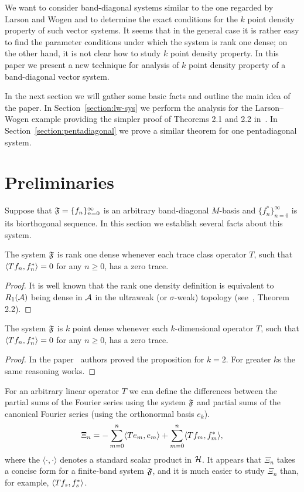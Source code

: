 \documentclass[12pt]{amsart}
\theoremstyle{case}
\begin{document}
    We want to consider band-diagonal systems similar to the one regarded by Larson and Wogen and to determine the exact conditions
      for the $k$ point density property of such vector systems.
    It seems that in the general case it is rather easy to find the parameter conditions under which the system is rank one dense;
      on the other hand, it is not clear how to study $k$ point density property.
    In this paper we present a new technique for analysis of $k$ point density property of a band-diagonal vector system.

    In the next section we will gather some basic facts and outline the main idea of the paper.
    In Section~\ref{section:lw-sys} we perform the analysis for the Larson--Wogen example providing the simpler proof of Theorems 2.1 and 2.2 in~\cite{katavolos}.
    In Section~\ref{section:pentadiagonal} we prove a similar theorem for one pentadiagonal system.
\section{Preliminaries}
  \label{sec:preliminaries}
  Suppose that $\fsys=\{f_n\}_{n=0}^\infty$ is an arbitrary band-diagonal $M$-basis and $\{f^*_n\}_{n=0}^\infty$ is its biorthogonal sequence.
  In this section we establish several facts about this system.
  \begin{prop}
    The system $\fsys$ is rank one dense whenever each trace class operator $T$,
      such that $\inner{Tf_n}{f_n^*} = 0$ for any $n \geq 0$, has a zero trace.
  \end{prop}
  \begin{proof}
    It is well known that the rank one density definition is equivalent to $R_1(\cal{A})$ being dense
      in $\cal{A}$ in the ultraweak (or $\sigma$-weak) topology (see~\cite{katavolos}, Theorem 2.2).
  \end{proof}
  \begin{prop}
    The system $\fsys$ is $k$ point dense whenever each $k$-dimensional operator $T$,
      such that $\inner{Tf_n}{f_n^*} = 0$ for any $n \geq 0$, has a zero trace.
  \end{prop}
  \begin{proof}
    In the paper~\cite{katavolos} authors proved the proposition for $k = 2$.
    For greater $k$s the same reasoning works.
  \end{proof}
  For an arbitrary linear operator $T$ we can define the differences between
    the partial sums of the Fourier series using the system $\fsys$ and
    partial sums of the canonical Fourier series (using the orthonormal basis $e_k$).
  \begin{equation}
    \label{eq:xi}
    \Xi_n = -\sum_{m=0}^n \inner{Te_m}{e_m} + \sum_{m=0}^n \inner{Tf_m}{f_m^*},
  \end{equation}
    where the $\langle \cdot, \cdot\rangle$ denotes a standard scalar product in $\cal{H}$.
  It appears that $\Xi_n$ takes a concise form for a finite-band system $\fsys$, and it is much easier to study $\Xi_n$
    than, for example, $\inner{Tf_s}{f_s^*}$.
\end{document}
